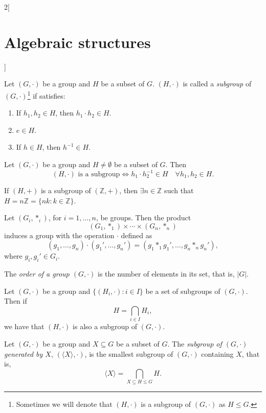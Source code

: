 \documentclass[../../../main.tex]{subfiles}
\begin{document}
\begin{multicols}{2}[\section{Algebraic structures}]
\begin{lemma}
\end{lemma}
\begin{definition}[Subgroup]
    Let $(G,\cdot)$ be a group and $H$ be a subset of $G$. $(H,\cdot)$ is called a \textit{subgroup} of $(G,\cdot)$\footnote{Sometimes we will denote that $(H,\cdot)$ is a subgroup of $(G,\cdot)$ as $H\leq G$.} if satisfies:
    \begin{enumerate}
        \item If $h_1,h_2\in H$, then $h_1\cdot h_2\in H$.
        \item $e\in H$.
        \item If $h\in H$, then $h^{-1}\in H$.
    \end{enumerate}
\end{definition}
\begin{prop}
    Let $(G,\cdot)$ be a group and $H\ne\emptyset$ be a subset of $G$. Then $$(H,\cdot)\text{ is a subgroup}\iff h_1\cdot h_2^{-1}\in H\quad\forall h_1,h_2\in H.$$
\end{prop}
\begin{prop}
    If $(H,+)$ is a subgroup of $(\mathbb{Z},+)$, then $\exists n\in\mathbb{Z}$ such that $H=n\mathbb{Z}=\{nk:k\in\mathbb{Z}\}$.
\end{prop}
\begin{prop}
    Let $(G_i,*_i)$, for $i=1,\ldots, n$, be groups. Then the product $$(G_1,*_1)\times\cdots\times(G_n,*_n)$$ induces a group with the operation $\cdot$ defined as $$(g_1,\ldots,g_n)\cdot(g_1',\ldots,g_n')=(g_1*_1g_1',\ldots,g_n*_ng_n'),$$ where $g_i,g_i'\in G_i$.
\end{prop}
\begin{definition}
    The \textit{order of a group $(G,\cdot)$} is the number of elements in its set, that is, $|G|$.
\end{definition}
\begin{lemma}
    Let $(G,\cdot)$ be a group and $\{(H_i,\cdot):i\in I\}$ be a set of subgroups of $(G,\cdot)$. Then if $$H=\displaystyle\bigcap_{i\in I}H_i,$$ we have that $(H,\cdot)$ is also a subgroup of $(G,\cdot)$.
\end{lemma}
\begin{definition}
    Let $(G,\cdot)$ be a group and $X\subseteq G$ be a subset of $G$. The \textit{subgroup of $(G,\cdot)$ generated by $X$}, $(\langle X\rangle,\cdot)$, is the smallest subgroup of $(G,\cdot)$ containing $X$, that is, $$\langle X\rangle=\bigcap_{X\subseteq H\leq G}H.$$
\end{definition}
\begin{definition}

\end{definition}
\end{multicols}
\end{document}
